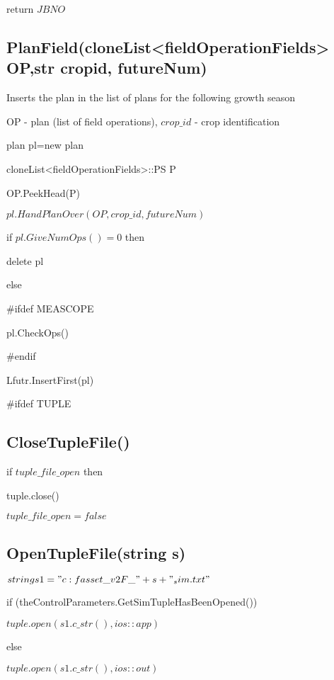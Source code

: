 \documentclass[%
]{scrartcl}
\begin{document}
{{	return $JBNO$




 \subsection{PlanField(cloneList<fieldOperationFields> 
 OP,str cropid, futureNum)}

Inserts the plan in the list of plans for the following growth season

   OP - plan (list of field operations),
   $crop\_id$ - crop identification
	
	plan  pl=new plan
	
	cloneList<fieldOperationFields>::PS P
	
	OP.PeekHead(P)
	
	$pl.HandPlanOver(OP,crop\_id,futureNum)$
	
   if $pl.GiveNumOps()=0$ then
   
    \quad 	delete pl
    
   else
  
\#ifdef MEASCOPE

     \quad	pl.CheckOps()
     
\#endif

	  \quad	Lfutr.InsertFirst(pl)
   




\#ifdef TUPLE

\subsection{CloseTupleFile()}
   if $tuple\_file\_open$ then
   
      \quad  tuple.close()
      
       \quad $tuple\_file\_open=false$

\subsection{OpenTupleFile(string s)}
   $string s1="c:\\fasset\_v2\\F\_"+s+"_sim.txt"$
   
   if (theControlParameters.GetSimTupleHasBeenOpened())
   
      \quad $ tuple.open(s1.c\_str(),ios::app)$
      
   else
   
     \quad $  tuple.open(s1.c\_str(),ios::out)$
     
}}
\end{document}
